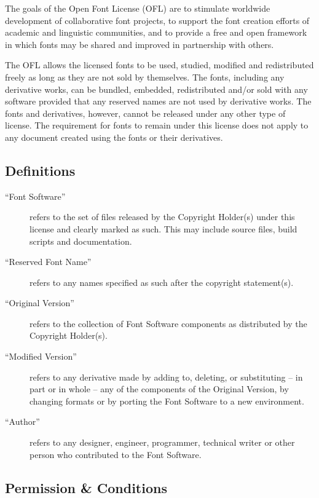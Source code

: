 \documentclass[paper=a4, 12pt]{scrbook}
\begin{document}
The goals of the Open Font License (OFL) are to stimulate worldwide development of collaborative font projects, to support the font creation efforts of academic and linguistic communities, and to provide a free and open framework in which fonts may be shared and improved in partnership with others.

The OFL allows the licensed fonts to be used, studied, modified and redistributed freely as long as they are not sold by themselves. The fonts, including any derivative works, can be bundled, embedded, redistributed and/or sold with any software provided that any reserved names are not used by derivative works. The fonts and derivatives, however, cannot be released under any other type of license. The requirement for fonts to remain under this license does not apply to any document created using the fonts or their derivatives.

\subsection{Definitions}

\begin{description}
	\item[“Font Software”] refers to the set of files released by the Copyright Holder(s) under this license and clearly marked as such. This may include source files, build scripts and documentation.

	\item[“Reserved Font Name”] refers to any names specified as such after the copyright statement(s).

	\item[“Original Version”] refers to the collection of Font Software components as distributed by the Copyright Holder(s).

	\item[“Modified Version”] refers to any derivative made by adding to, deleting, or substituting – in part or in whole – any of the components of the Original Version, by changing formats or by porting the Font Software to a new environment.

	\item[“Author”] refers to any designer, engineer, programmer, technical writer or other person who contributed to the Font Software.
\end{description}

\subsection{Permission \& Conditions}
\end{document}
